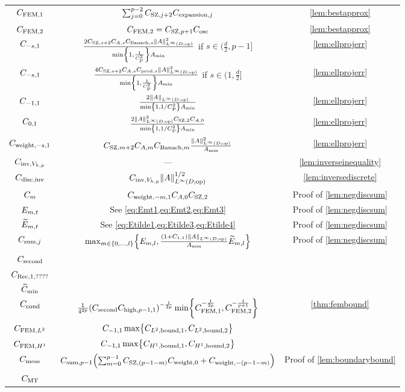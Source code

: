 \begin{longtabu}{ccc}
  $C_{\mathrm{FEM},1}$ & $\sum_{j=0}^{p-2}C_{\mathrm{SZ},j+2}C_{\mathrm{expansion},j} $ & \cref{lem:bestapprox}\\
  $C_{\mathrm{FEM},2}$ & $C_{\mathrm{FEM},2} = C_{\mathrm{SZ},p+1}C_{\mathrm{osc}}$ & \cref{lem:bestapprox}\\
  $C_{-s,1}$ &$\frac{2\CSZfn{s+2}\CAfn{s}\CBanfn{s}\NLiDop{A}^2}{\min\set{1,\frac1{\CP^2}}\Amin}$ if $s \in (\frac{d}2,p-1]$& \cref{lem:ellprojerr} \\
  $C_{-s,1}$ &$\frac{4\CSZfn{s+2}\CAfn{s}\Cprod{s}\NLiDop{A}^2}{\min\set{1,\frac1{\CP^2}}\Amin}$ if $s \in (1,\frac{d}2]$& \cref{lem:ellprojerr} \\
  $C_{-1,1}$ &$\frac{2\NLiDop{A}}{\min\set{1,1/\CP^2}\Amin}$& \cref{lem:ellprojerr} \\
  $C_{0,1}$ &$\frac{2\NLiDop{A}^2\CSZfn{2}\CAfn{0}}{\min\set{1,1/\CP^2}\Amin}$& \cref{lem:ellprojerr} \\
  $C_{\mathrm{weight},-s,1}$ &$\CSZfn{m+2}\CAfn{m}\CBanfn{m}\frac{\NLiDop{A}^2}{\Amin}$& \cref{lem:ellprojerr} \\
  $C_{\mathrm{inv},V_{h,p}}$ &---& \cref{lem:inverseinequality}\\
  $C_{\mathrm{disc},\mathrm{inv}}$ & $\CinvVhp \NLiDop{A}^{1/2}$ & \cref{lem:inversediscrete}\\
  $C_{m}$ & $C_{\mathrm{weight},-m,1}  C_{A,0} C_{\mathrm{SZ},2}$ & Proof of \cref{lem:negdiscsum}\\
  $E_{m,t}$ & See \cref{eq:Emt1,eq:Emt2,eq:Emt3} & Proof of \cref{lem:negdiscsum}\\
  $\widetilde{E}_{m,t}$ & See \cref{eq:Etilde1,eq:Etilde3,eq:Etilde4} & Proof of \cref{lem:negdiscsum}\\
  $C_{\mathrm{sum},j}$ &$\max_{m \in \set{0,\ldots,l}}\set{\Efn{m,l},\frac{\mleft(1+\Cfn{1,1}\mright)\NLiDop{A}}{\Amin}\Etildefn{m,l}}$ & Proof of \cref{lem:negdiscsum}\\
  $C_{\mathrm{second}}$ &&\\
  $C_{\mathrm{Rec},1,????}$&&\\
  $\widetilde{C}_{\min}$&&\\
  $C_{\mathrm{cond}}$ & $\frac1{4^{2p}} \mleft(\Csecond\Chighfn{p-1,1}\mright)^{-\frac1{2p}} \min\set{\CFEMo^{-\frac1{2p}},\CFEMt^{-\frac1{p+1}}}$ & \cref{thm:fembound}\\
  $C_{\mathrm{FEM},L^{2}}$ &$\Cfn{-1,1} \max\set{\CLtboundo,\CLtboundt}$&\\
  $C_{\mathrm{FEM},H^{1}}$ &$\Cfn{-1,1}\max\set{\CHoboundo,\CHoboundt}$&\\
  $C_{\mathrm{mess}}$ &$\Csumpmo \mleft(\sum_{m=0}^{p-1} \CSZfn{(p-1-m)} \Cwfn{0} + \Cwfn{-(p-1-m)}\mright)$&Proof of \cref{lem:boundarybound}\\
  $C_{\mathrm{MT}}$ &&\\

\end{longtabu}
